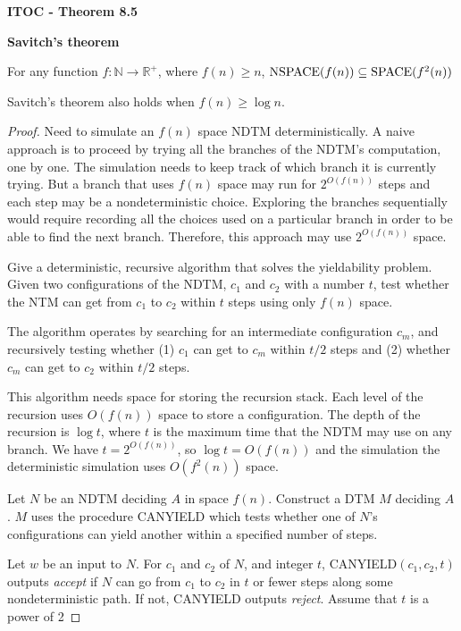 \begin{shaded}
\textbf{ITOC - Theorem 8.5}

\medskip
\textbf{Savitch's theorem} 

For any function $f:\mathbb{N} \rightarrow \mathbb{R}^+$, where $f(n) \geq n$, $\text{NSPACE}(f(n)) \subseteq \text{SPACE}(f^2(n))$
\end{shaded}

{\color{blue} Savitch's theorem also holds when $f(n) \geq \log n$.}

\begin{mdframed}
\begin{proof}
Need to simulate an $f(n)$ space NDTM deterministically. A naive approach is to proceed by trying all the branches of the NDTM's computation, one by one. The simulation needs to keep track of which branch it is currently trying. {\color{blue} But a branch that uses $f(n)$ space may run for $2^{O(f(n))}$ steps and each step may be a nondeterministic choice.} Exploring the branches sequentially would require recording all the choices used on a particular branch in order to be able to find the next branch. Therefore, this approach may use $2^{O(f(n))}$ space.

\medskip
Give a deterministic, recursive algorithm that solves the yieldability problem. Given two configurations of the NDTM, $c_1$ and $c_2$ with a number $t$, test whether the NTM can get from $c_1$ to $c_2$ within $t$ steps using only $f(n)$ space.

The algorithm operates by searching for an intermediate configuration $c_m$, and recursively testing whether (1) $c_1$ can get to $c_m$ within $t/2$ steps and (2) whether $c_m$ can get to $c_2$ within $t/2$ steps.

This algorithm needs space for storing the recursion stack. Each level of the  recursion uses $O(f(n))$ space to store a configuration. The depth of the recursion is $\log t$, where $t$ is the maximum time that the NDTM may use on any branch. We have $t = 2^{O(f(n))}$, so $\log t = O(f(n))$ and the simulation the deterministic simulation uses $O(f^2(n))$ space.

\medskip
Let $N$ be an NDTM deciding $A$ in space $f(n)$. Construct a DTM $M$ deciding $A$. $M$ uses the procedure CANYIELD which tests whether one of $N$'s configurations can yield another within a specified number of steps.

Let $w$ be an input to $N$. For $c_1$ and $c_2$ of $N$, and integer $t$, CANYIELD$(c_1, c_2, t)$ outputs \textit{accept} if $N$ can go from $c_1$ to $c_2$ in $t$ or fewer steps along some nondeterministic path. If not, CANYIELD outputs \textit{reject}. Assume that $t$ is a power of 2


\end{proof}
\end{mdframed}
